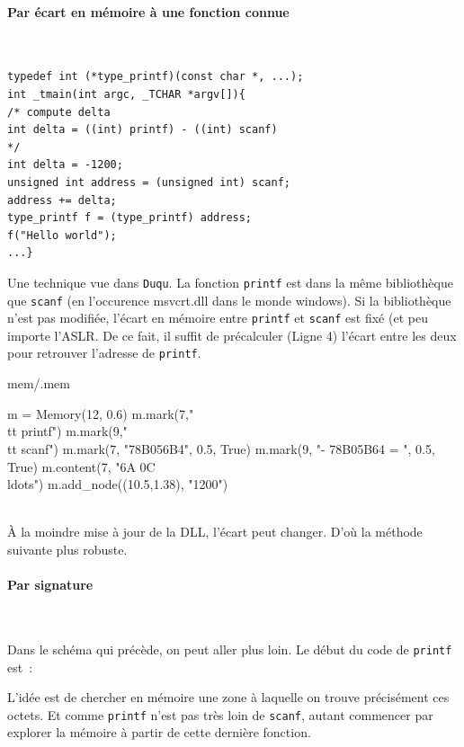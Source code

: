 \documentclass{book}
\newcounter{Qcours}
\newenvironment{memory}{%
	\noindent
	\VerbatimEnvironment\stepcounter{Qcours}%
	\begin{VerbatimOut}{mem/\theQcours.mem}%
	}{\end{VerbatimOut}%
}
\newenvironment{commentaire}[1]{%
	\def\FrameCommand{\fboxrule=\FrameRule\fboxsep=\FrameSep \fcolorbox{yellow!50}{yellow!10}}%
	\MakeFramed {\advance\hsize-\width \FrameRestore}
	\noindent {\bf #1}\\
}%
{\endMakeFramed}
\newcommand{\code}[1]{\texttt{#1}}
\begin{document}
\paragraph{Par écart en mémoire à une fonction connue}{~}

\begin{verbatim}
typedef int (*type_printf)(const char *, ...);
int _tmain(int argc, _TCHAR *argv[]){
/* compute delta 
int delta = ((int) printf) - ((int) scanf)
*/
int delta = -1200;
unsigned int address = (unsigned int) scanf;
address += delta;
type_printf f = (type_printf) address;
f("Hello world");
...}
\end{verbatim}

Une technique vue dans {\tt Duqu}. La fonction \code{printf} est dans la même bibliothèque que \code{scanf} (en l'occurence {\sc msvcrt.dll} dans le monde {\sc windows}). Si la bibliothèque n'est pas modifiée, l'écart en mémoire entre \code{printf} et \code{scanf} est fixé (et peu importe l'ASLR. De ce fait, il suffit de précalculer (Ligne 4) l'écart entre les deux pour retrouver l'adresse de \code{printf}. 

\bigskip

\begin{memory}
m = Memory(12, 0.6)
m.mark(7,"\\tt printf")
m.mark(9,"\\tt scanf")
m.mark(7, "78B056B4", 0.5, True)
m.mark(9, "- 78B05B64 = ", 0.5, True)
m.content(7, "6A 0C \\ldots")
m.add_node((10.5,1.38), "1200")
\end{memory}





\begin{commentaire}{Fragilités}
\`A la moindre mise à jour de la DLL, l'écart peut changer. D'où la méthode suivante plus robuste. 	
\end{commentaire}

\paragraph{Par signature}{~}

Dans le schéma qui précède, on peut aller plus loin. Le début du code de \code{printf} est~: 

L'idée est de chercher en mémoire une zone à laquelle on trouve précisément ces octets. Et comme \code{printf} n'est pas très loin de \code{scanf}, autant commencer par explorer la mémoire à partir de cette dernière fonction. 
\end{document}
